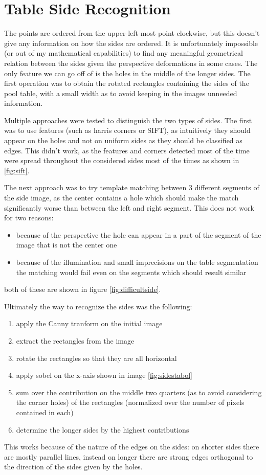 \section{Table Side Recognition}

The points are ordered from the upper-left-most point clockwise, but this doesn't give
any information on how the sides are ordered. It is unfortunately impossible (or out of my
mathematical capabilities) to find any meaningful geometrical relation between the sides
given the perspective deformations in some cases. The only feature we can go off of is the 
holes in the middle of the longer sides. The first operation was to obtain the rotated
rectangles containing the sides of the pool table, with a small width as to avoid 
keeping in the images unneeded information.\par 
Multiple approaches were tested to distinguish the two types of sides. The first was 
to use features (such as harris corners or SIFT), as intuitively they should appear 
on the holes and not on uniform sides as they should be classified as edges. This didn't
work, as the features and corners detected most of the time were spread throughout the 
considered sides most of the times as shown in \ref{fig:sift}.\par
The next approach was to try template matching between 3 different segments of the side image,
as the center contains a hole which should make the match significantly worse than
between the left and right segment. This does not work for two reasons:
\begin{itemize}
    \item because of the perspective the hole can appear in a part of the segment of the image that is not the center one
    \item because of the illumination and small imprecisions on the table segmentation the matching would fail even on the segments which should result similar
\end{itemize}
both of these are shown in figure \ref{fig:difficultside}.
\par
Ultimately the way to recognize the sides was the following:
\begin{enumerate}
    \item apply the Canny tranform on the initial image
    \item extract the rectangles from the image
    \item rotate the rectangles so that they are all horizontal
    \item apply sobel on the x-axis shown in image \ref{fig:sidestabol}
    \item sum over the contribution on the middle two quarters (as to avoid considering the corner holes) of the rectangles (normalized over the number of pixels contained in each)
    \item determine the longer sides by the highest contributions
\end{enumerate}
This works because of the nature of the edges on the sides: on shorter sides there
are mostly parallel lines, instead on longer there are strong edges orthogonal to the direction of the sides given by the holes.

